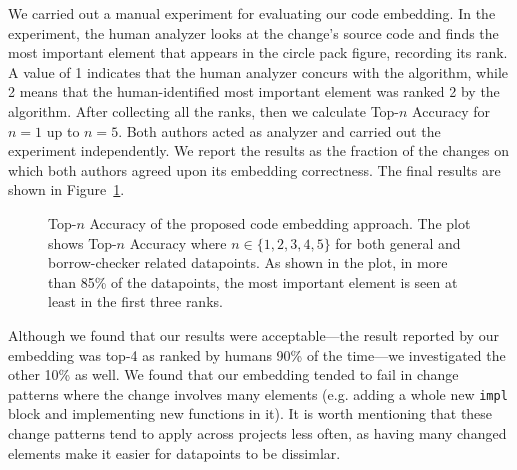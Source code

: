 We carried out a manual experiment for evaluating our code embedding. In the experiment, the human analyzer looks at the change's source code and finds the most important element that appears in the circle pack figure, recording its rank. A value of 1 indicates that the human analyzer concurs with the algorithm, while 2 means that the human-identified most important element was ranked 2 by the algorithm. After collecting all the ranks, then we calculate Top-$n$ Accuracy for $n=1$ up to $n=5$. Both authors acted as analyzer and carried out the experiment independently. We report the results as the fraction of the changes on which both authors agreed upon its embedding correctness. The final results are shown in Figure~\ref{fig:rq1}.

\begin{figure}[h]
\centering

\caption{\label{fig:rq1} Top-$n$ Accuracy of the proposed code embedding approach. The plot shows Top-$n$ Accuracy where $n\in\{1,2,3,4,5\}$ for both general and borrow-checker related datapoints. As shown in the plot, in more than 85\% of the datapoints, the most important element is seen at least in the first three ranks.}

\end{figure}

Although we found that our results were acceptable---the result reported by our embedding was top-4 as ranked by humans 90\% of the time---we investigated the other 10\% as well. We found that our embedding tended to fail in change patterns where the change involves many elements (e.g. adding a whole new \verb+impl+ block and implementing new functions in it). It is worth mentioning that these change patterns tend to apply across projects less often, as having many changed elements make it easier for datapoints to be dissimlar.

